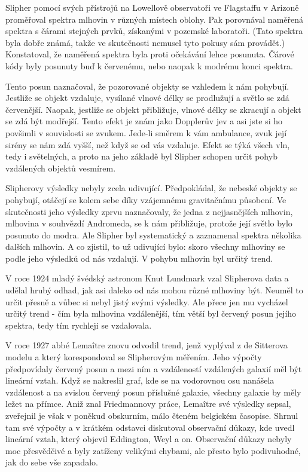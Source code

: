   Slipher pomocí svých přístrojů na Lowellově observatoři ve Flagstaffu v Arizoně proměřoval spektra
  mlhovin v různých místech oblohy. Pak porovnával naměřená spektra s čárami stejných prvků,
  získanými v pozemské laboratoři. (Tato spektra byla dobře známá, takže ve skutečnosti nemusel tyto
  pokusy sám provádět.) Konstatoval, že naměřená spektra byla proti očekávání lehce posunuta. Čárové
  kódy byly posunuty buď k červenému, nebo naopak k modrému konci spektra. 
  
  Tento posun naznačoval, že pozorované objekty se vzhledem k nám pohybují. Jestliže se objekt
  vzdaluje, vysílané vlnové délky se prodlužují a světlo se zdá červenější. Naopak, jestliže se
  objekt přibližuje, vlnové délky se zkracují a objekt se zdá být modřejší. Tento efekt je znám jako
  Dopplerův jev a asi jste si ho povšimli v souvislosti se zvukem. Jede-li směrem k vám ambulance,
  zvuk její sirény se nám zdá vyšší, než když se od vás vzdaluje. Efekt se týká všech vln, tedy i
  světelných, a proto na jeho základě byl Slipher schopen určit pohyb vzdálených objektů vesmírem.
  
  Slipherovy výsledky nebyly zcela udivující. Předpokládal, že nebeské objekty se pohybují, otáčejí
  se kolem sebe díky vzájemnému gravitačnímu působení. Ve skutečnosti jeho výsledky zprvu
  naznačovaly, že jedna z nejjasnějších mlhovin, mlhovina v souhvězdí Andromeda, se k nám
  přibližuje, protože její světlo bylo posunuto do modra. Ale Slipher byl systematický a zaznamenal
  spektra několika dalších mlhovin. A co zjistil, to už udivující bylo: skoro všechny mlhoviny se
  podle jeho výsledků od nás vzdalují. V pohybu mlhovin byl určitý trend. 
  
  V roce 1924 mladý švédský astronom Knut Lundmark vzal Slipherova data a udělal hrubý odhad, jak
  asi daleko od nás mohou různé mlhoviny být. Neuměl to určit přesně a vůbec si nebyl jistý svými
  výsledky. Ale přece jen mu vycházel určitý trend - čím byla mlhovina vzdálenější, tím větší byl
  červený posun jejího spektra, tedy tím rychleji se vzdalovala. 
  
  V roce 1927 abbé Lemaître znovu odvodil trend, jenž vyplýval z de Sitterova modelu a který
  korespondoval se Slipherovým měřením. Jeho výpočty předpovídaly červený posun a mezi ním a
  vzdáleností vzdálených galaxií měl být lineární vztah. Když se nakreslil graf, kde se na
  vodorovnou osu nanášela vzdálenost a na svislou červený posun příslušné galaxie, všechny galaxie
  by měly ležet na přímce. Aniž znal Friedmannovy práce, Lemaître své výsledky sepsal, zveřejnil je
  však v poněkud obskurním, málo čteném belgickém časopise. Shrnul tam své výpočty a v krátkém
  odstavci diskutoval observační důkazy, kde uvedl lineární vztah, který objevil Eddington, Weyl a
  on. Observační důkazy nebyly moc přesvědčivé a byly zatíženy velikými chybami, ale přesto bylo
  podivuhodné, jak do sebe vše zapadalo. 
  
